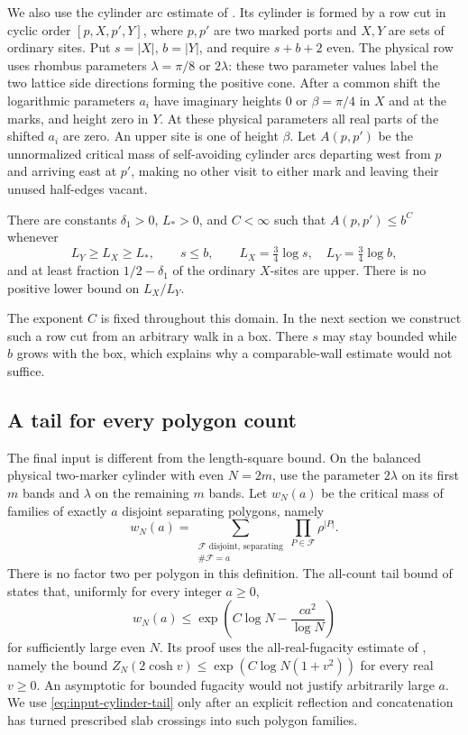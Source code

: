 We also use the cylinder arc estimate of \cite[Theorem 8.3]{MarkedCompanion}.
Its cylinder is
formed by a row cut in cyclic order \([p,X,p',Y]\), where \(p,p'\)
are two marked ports and \(X,Y\) are sets of ordinary sites. Put
\(s=|X|\), \(b=|Y|\), and require \(s+b+2\) even. The physical row
uses rhombus parameters \(\lambda=\pi/8\) or \(2\lambda\): these
two parameter values label the two lattice side directions forming the
positive cone. After a
common shift the logarithmic parameters \(a_i\) have imaginary heights
\(0\) or \(\beta=\pi/4\) in \(X\) and at the marks, and height
zero in \(Y\). At these physical parameters all real parts of the
shifted \(a_i\) are zero. An upper site is one of height \(\beta\). Let
\(A(p,p')\) be the unnormalized critical mass of self-avoiding cylinder
arcs departing west from \(p\) and arriving east at \(p'\), making no
other visit to either mark and leaving their unused half-edges vacant.
\begin{theorem}\label{09_fast_paths:one-arc-bound}
There are constants \(\delta_1>0\), \(L_*>0\), and \(C<\infty\)
such that \(A(p,p')\le b^C\) whenever
\[
 L_Y\ge L_X\ge L_*,\qquad s\le b,\qquad
 L_X=\tfrac34\log s,\quad L_Y=\tfrac34\log b,
\]
and at least fraction \(1/2-\delta_1\) of the ordinary \(X\)-sites
are upper. There is no positive lower bound on \(L_X/L_Y\).
\end{theorem}
The exponent \(C\) is fixed throughout this domain. In the next section
we construct such a row cut from an arbitrary walk in a box. There
\(s\) may stay bounded while \(b\) grows with the box, which explains
why a comparable-wall estimate would not suffice.

\subsection{A tail for every polygon count}
The final input is different from the length-square bound. On the
balanced physical two-marker cylinder with even \(N=2m\), use the
parameter \(2\lambda\) on its first \(m\) bands and \(\lambda\)
on the remaining \(m\) bands. Let \(w_N(a)\) be the critical mass of
families of exactly \(a\) disjoint separating polygons, namely
\[
 w_N(a)=\sum_{\substack{\mathcal F\text{ disjoint, separating}\\
                         \#\mathcal F=a}}
               \prod_{P\in\mathcal F}\rho^{|P|}.
\]
There is no factor two per polygon in this definition. The all-count
tail bound of \cite[Corollary 8.2]{CylinderCompanion} states that, uniformly for
every integer \(a\ge0\),
\begin{equation}\label{eq:input-cylinder-tail}
 w_N(a)\le \exp\left(C\log N-\frac{ca^2}{\log N}\right)
\end{equation}
for sufficiently large even \(N\). Its proof uses the all-real-fugacity estimate of
\cite[Theorem 8.1]{CylinderCompanion}, namely the bound
\(Z_N(2\cosh v)\le\exp(C\log N(1+v^2))\) for every real \(v\ge0\).
An asymptotic for bounded fugacity would not justify arbitrarily large
\(a\). We use \eqref{eq:input-cylinder-tail} only after an explicit
reflection and concatenation has turned prescribed slab crossings into
such polygon families.
